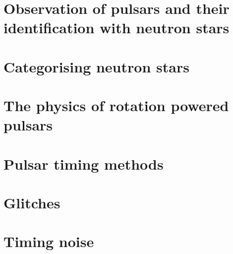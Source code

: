 \documentclass[../full_thesis/full_thesis.tex]{subfiles}
\newcommand{\IntroductionDir}{../introduction}
\begin{document}
 



\section{Observation of pulsars and their identification with neutron stars}


\section{Categorising neutron stars}


\section{The physics of rotation powered pulsars} 
\label{sec: rotation powered pulsars}


\FloatBarrier
%

\section{Pulsar timing methods}
\label{sec: pulsar timing methods}


\section{Glitches}
\label{ref: glitches}


\FloatBarrier
\section{Timing noise}
\label{sec: timing noise}


\biblio
\end{document}
